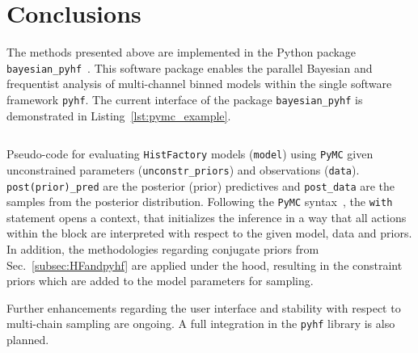 \section{Conclusions}\label{sec:conclusions}

The methods presented above are implemented in the Python package \texttt{bayesian\_pyhf}~\cite{BayesianPyhf}. This software package enables the parallel Bayesian and frequentist analysis of multi-channel binned models within the single software framework \texttt{pyhf}.
The current interface of the package \texttt{bayesian\_pyhf} is demonstrated in Listing~\ref{lst:pymc_example}.

\begin{listing}
 \inputminted{python}{src/code/pymc_example.py}
 \caption{Pseudo-code for evaluating \texttt{HistFactory} models (\texttt{model}) using \texttt{PyMC} given unconstrained parameters (\texttt{unconstr\_priors}) and observations (\texttt{data}). \texttt{post(prior)\_pred} are the posterior (prior) predictives and \texttt{post\_data} are the samples from the posterior distribution. Following the \texttt{PyMC} syntax~\cite{PyMC}, the \texttt{with} statement opens a context, that initializes the inference in a way that all actions within the block are interpreted with respect to the given model, data and priors. In addition, the methodologies regarding conjugate priors from Sec.~\ref{subsec:HFandpyhf} are applied under the hood, resulting in the constraint priors which are added to the model parameters for sampling.}
 \label{lst:pymc_example}
\end{listing}

\noindent Further enhancements regarding the user interface and stability with respect to multi-chain sampling are ongoing. A full integration in the \texttt{pyhf} library is also planned.
